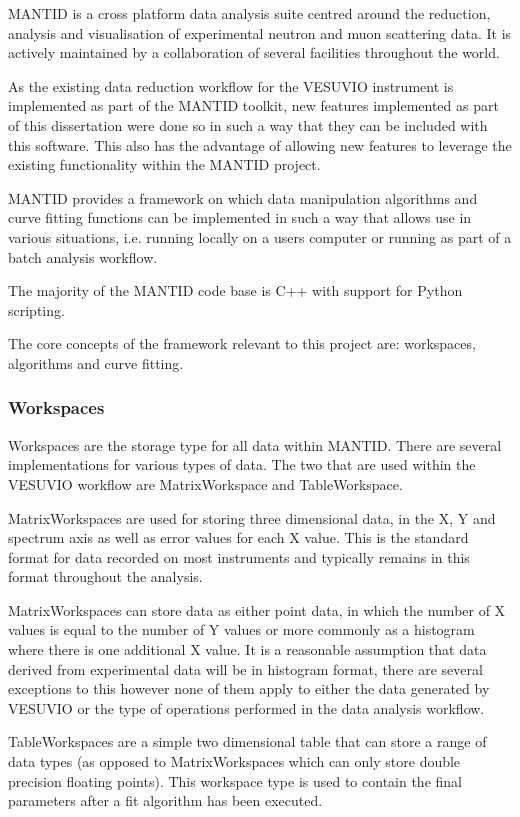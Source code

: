 \documentclass[a4paper]{article}
\begin{document}
\gls*{MANTID} \cite{Mantid} is a cross platform data analysis suite centred
around the reduction, analysis and visualisation of experimental neutron and
muon scattering data. It is actively maintained by a collaboration of several
facilities throughout the world.

As the existing data reduction workflow for the VESUVIO instrument is
implemented as part of the \gls*{MANTID} toolkit, new features implemented as
part of this dissertation were done so in such a way that they can be included
with this software. This also has the advantage of allowing new features to
leverage the existing functionality within the \gls*{MANTID} project.

\gls*{MANTID} provides a framework on which data manipulation algorithms and
curve fitting functions can be implemented in such a way that allows use in
various situations, i.e. running locally on a users computer or running as part
of a batch analysis workflow.

The majority of the \gls*{MANTID} code base is C++ with support for Python
scripting.

The core concepts of the framework relevant to this project are: workspaces,
algorithms and curve fitting.

\subsubsection{Workspaces}

Workspaces are the storage type for all data within \gls*{MANTID}. There are
several implementations for various types of data. The two that are used within
the VESUVIO workflow are MatrixWorkspace and TableWorkspace.

MatrixWorkspaces are used for storing three dimensional data, in the X, Y and
spectrum axis as well as error values for each X value. This is the standard
format for data recorded on most instruments and typically remains in this
format throughout the analysis.

MatrixWorkspaces can store data as either point data, in which the number of X
values is equal to the number of Y values or more commonly as a histogram where
there is one additional X value. It is a reasonable assumption that data derived
from experimental data will be in histogram format, there are several exceptions
to this however none of them apply to either the data generated by VESUVIO or
the type of operations performed in the data analysis workflow.

TableWorkspaces are a simple two dimensional table that can store a range of
data types (as opposed to MatrixWorkspaces which can only store double precision
floating points). This workspace type is used to contain the final parameters
after a fit algorithm has been executed.
\end{document}

